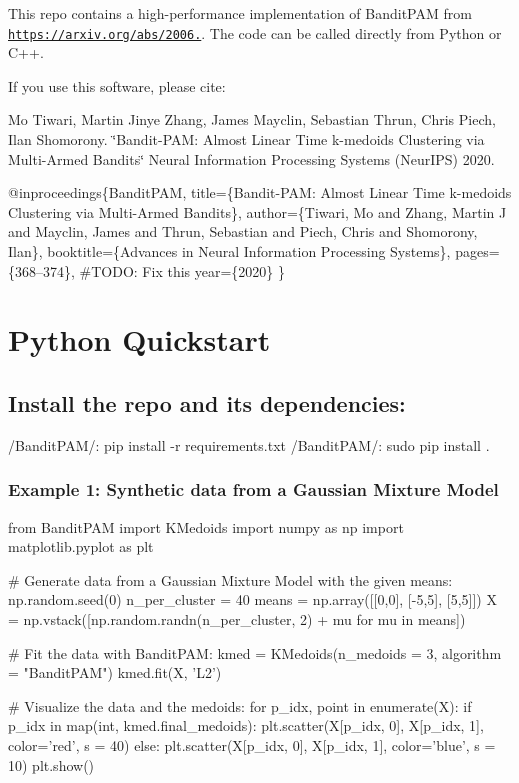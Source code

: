 This repo contains a high-\/performance implementation of Bandit\+P\+AM from \href{https://arxiv.org/abs/2006.06856}{\tt https\+://arxiv.\+org/abs/2006.}. The code can be called directly from Python or C++.

If you use this software, please cite\+:

Mo Tiwari, Martin Jinye Zhang, James Mayclin, Sebastian Thrun, Chris Piech, Ilan Shomorony. \char`\"{}\+Bandit-\/\+P\+A\+M\+: Almost Linear Time k-\/medoids Clustering via Multi-\/\+Armed Bandits\char`\"{} Neural Information Processing Systems (Neur\+I\+PS) 2020.


\begin{DoxyCode}
@inproceedings\{BanditPAM,
  title=\{Bandit-PAM: Almost Linear Time k-medoids Clustering via Multi-Armed Bandits\},
  author=\{Tiwari, Mo and Zhang, Martin J and Mayclin, James and Thrun, Sebastian and Piech, Chris and
       Shomorony, Ilan\},
  booktitle=\{Advances in Neural Information Processing Systems\},
  pages=\{368--374\}, #TODO: Fix this
  year=\{2020\}
\}
\end{DoxyCode}


\section*{Python Quickstart}

\subsection*{Install the repo and its dependencies\+:}


\begin{DoxyCode}
/BanditPAM/: pip install -r requirements.txt
/BanditPAM/: sudo pip install .
\end{DoxyCode}


\subsubsection*{Example 1\+: Synthetic data from a Gaussian Mixture Model}


\begin{DoxyCode}
from BanditPAM import KMedoids
import numpy as np
import matplotlib.pyplot as plt

# Generate data from a Gaussian Mixture Model with the given means:
np.random.seed(0)
n\_per\_cluster = 40
means = np.array([[0,0], [-5,5], [5,5]])
X = np.vstack([np.random.randn(n\_per\_cluster, 2) + mu for mu in means])

# Fit the data with BanditPAM:
kmed = KMedoids(n\_medoids = 3, algorithm = "BanditPAM")
kmed.fit(X, 'L2')

# Visualize the data and the medoids:
for p\_idx, point in enumerate(X):
    if p\_idx in map(int, kmed.final\_medoids):
        plt.scatter(X[p\_idx, 0], X[p\_idx, 1], color='red', s = 40)
    else:
        plt.scatter(X[p\_idx, 0], X[p\_idx, 1], color='blue', s = 10)
plt.show()
\end{DoxyCode}




